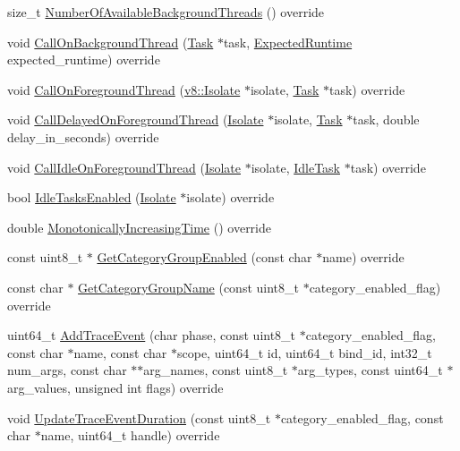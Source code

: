 \begin{DoxyCompactItemize}
\item 
size\+\_\+t \hyperlink{classv8_1_1platform_1_1_default_platform_a32174d8d26b090dde9b13179a3adafad}{Number\+Of\+Available\+Background\+Threads} () override
\item 
void \hyperlink{classv8_1_1platform_1_1_default_platform_afcb6a6fc13ffaf97689d44e8ced97017}{Call\+On\+Background\+Thread} (\hyperlink{classv8_1_1_task}{Task} $\ast$task, \hyperlink{classv8_1_1_platform_ace7f666b2b5995bb0e898e12fa660718}{Expected\+Runtime} expected\+\_\+runtime) override
\item 
void \hyperlink{classv8_1_1platform_1_1_default_platform_ac7d7fb6996ce70dced9b3ad0848c267f}{Call\+On\+Foreground\+Thread} (\hyperlink{classv8_1_1_isolate}{v8\+::\+Isolate} $\ast$isolate, \hyperlink{classv8_1_1_task}{Task} $\ast$task) override
\item 
void \hyperlink{classv8_1_1platform_1_1_default_platform_a3dbdde1854d4b58c923359ca44de4ddc}{Call\+Delayed\+On\+Foreground\+Thread} (\hyperlink{classv8_1_1_isolate}{Isolate} $\ast$isolate, \hyperlink{classv8_1_1_task}{Task} $\ast$task, double delay\+\_\+in\+\_\+seconds) override
\item 
void \hyperlink{classv8_1_1platform_1_1_default_platform_a7863da2c41903c325e4f33fa832e76fd}{Call\+Idle\+On\+Foreground\+Thread} (\hyperlink{classv8_1_1_isolate}{Isolate} $\ast$isolate, \hyperlink{classv8_1_1_idle_task}{Idle\+Task} $\ast$task) override
\item 
bool \hyperlink{classv8_1_1platform_1_1_default_platform_a002ce8f7666b3eece368b39c67d69f07}{Idle\+Tasks\+Enabled} (\hyperlink{classv8_1_1_isolate}{Isolate} $\ast$isolate) override
\item 
double \hyperlink{classv8_1_1platform_1_1_default_platform_a18e7c05daaf277740e84db0e6712fc46}{Monotonically\+Increasing\+Time} () override
\item 
const uint8\+\_\+t $\ast$ \hyperlink{classv8_1_1platform_1_1_default_platform_a5dedff00a5627004c6f139619597dc41}{Get\+Category\+Group\+Enabled} (const char $\ast$name) override
\item 
const char $\ast$ \hyperlink{classv8_1_1platform_1_1_default_platform_a306b79419ee468d9473fde2925170832}{Get\+Category\+Group\+Name} (const uint8\+\_\+t $\ast$category\+\_\+enabled\+\_\+flag) override
\item 
uint64\+\_\+t \hyperlink{classv8_1_1platform_1_1_default_platform_a717f22333954b61ff3936fa8f1f69884}{Add\+Trace\+Event} (char phase, const uint8\+\_\+t $\ast$category\+\_\+enabled\+\_\+flag, const char $\ast$name, const char $\ast$scope, uint64\+\_\+t id, uint64\+\_\+t bind\+\_\+id, int32\+\_\+t num\+\_\+args, const char $\ast$$\ast$arg\+\_\+names, const uint8\+\_\+t $\ast$arg\+\_\+types, const uint64\+\_\+t $\ast$arg\+\_\+values, unsigned int flags) override
\item 
void \hyperlink{classv8_1_1platform_1_1_default_platform_acac9d2577a312234466c31379972a182}{Update\+Trace\+Event\+Duration} (const uint8\+\_\+t $\ast$category\+\_\+enabled\+\_\+flag, const char $\ast$name, uint64\+\_\+t handle) override
\end{DoxyCompactItemize}
